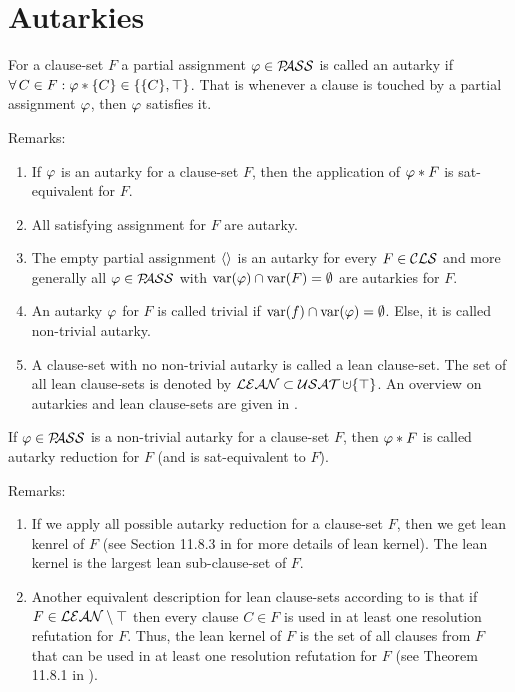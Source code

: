 \documentclass{report}
\begin{document}
\section{Autarkies}
\label{sec:autrk}

\begin{defi}\label{def:autarky}
For a clause-set $F$ a partial assignment $\varphi \in \mathcal{P\hspace{-0.32em}ASS}$ is called an autarky if $\forall\, C \in F : \varphi * \{ C \} \in \{ \{ C \}, \top \}$. That is whenever a clause is touched by a partial assignment $\varphi$, then $\varphi$ satisfies it.
\end{defi}
Remarks:
  \begin{enumerate}
  \item If $\varphi$ is an autarky for a clause-set $F$, then the application of $\varphi *F$ is sat-equivalent for $F$. 
  \item All satisfying assignment for $F$ are autarky.
  \item The empty partial assignment $\langle  \rangle$ is an autarky for every $F \in \mathcal{CLS}$ and more generally all $\varphi \in \mathcal{P\hspace{-0.32em}ASS}$ with $\operatorname{var}(\varphi) \cap \operatorname{var}(F) = \emptyset$ are autarkies for $F$. 
  \item An autarky $\varphi$ for $F$ is called trivial if $\operatorname{var}(f) \cap \operatorname{var}(\varphi) = \emptyset$. Else, it is called non-trivial autarky.
  \item A clause-set with no non-trivial autarky is called a lean clause-set. The set of all lean clause-sets is denoted by $\Lean \subset \Usat \addcup \set{\top}$. An overview on autarkies and lean clause-sets are given in \cite{h28, h25}. 
  \end{enumerate}
  
\begin{defi}\label{def:autarky-redc}
If $\varphi \in \mathcal{P\hspace{-0.32em}ASS}$ is a non-trivial autarky for a clause-set $F$, then $\varphi *F$ is called autarky reduction for $F$ (and is sat-equivalent to $F$).
\end{defi} 
Remarks:
  \begin{enumerate}
  \item If we apply all possible autarky reduction for a clause-set $F$, then we get lean kenrel of $F$ (see Section 11.8.3 in \cite{h25} for more details of lean kernel). The lean kernel is the largest lean sub-clause-set of $F$.
  \item Another equivalent description for lean clause-sets according to \cite{h28} is that if $F \in \mathcal{LEAN} \setminus \top$ then every clause $C \in F$ is used in at least one resolution refutation for $F$. Thus, the lean kernel of $F$ is the set of all clauses from $F$ that can be used in at least one resolution refutation for $F$ (see Theorem 11.8.1 in \cite{h25}).
  \end{enumerate}
\end{document}
